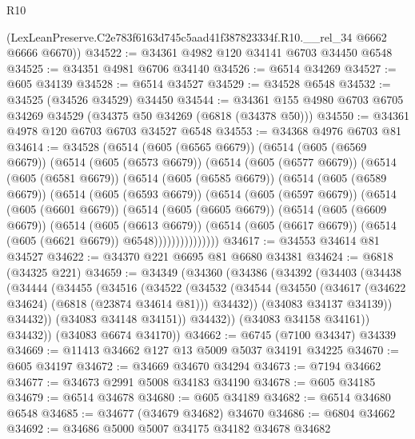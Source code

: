 \begin{lexlean}{R10}
\begin{coremodule}
      (LexLeanPreserve.C2e783f6163d745c5aad41f387823334f.R10.__rel_34 @6662 @6666 @6670))
@34522 := @34361 @4982 @120 @34141 @6703 @34450 @6548
@34525 := @34351 @4981 @6706 @34140
@34526 := @6514 @34269
@34527 := @605 @34139
@34528 := @6514 @34527
@34529 := @34528 @6548
@34532 := @34525 (@34526 @34529) @34450
@34544 := @34361 @155 @4980 @6703 @6705 @34269 @34529 (@34375 @50 @34269 (@6818 (@34378 @50)))
@34550 := @34361 @4978 @120 @6703 @6703 @34527 @6548
@34553 := @34368 @4976 @6703 @81
@34614 := @34528
    (@6514
      (@605 (@6565 @6679))
      (@6514
        (@605 (@6569 @6679))
        (@6514
          (@605 (@6573 @6679))
          (@6514
            (@605 (@6577 @6679))
            (@6514
              (@605 (@6581 @6679))
              (@6514
                (@605 (@6585 @6679))
                (@6514
                  (@605 (@6589 @6679))
                  (@6514
                    (@605 (@6593 @6679))
                    (@6514
                      (@605 (@6597 @6679))
                      (@6514
                        (@605 (@6601 @6679))
                        (@6514
                          (@605 (@6605 @6679))
                          (@6514
                            (@605 (@6609 @6679))
                            (@6514
                              (@605 (@6613 @6679))
                              (@6514
                                (@605 (@6617 @6679))
                                (@6514 (@605 (@6621 @6679)) @6548)))))))))))))))
@34617 := @34553 @34614 @81 @34527
@34622 := @34370 @221 @6695 @81 @6680 @34381
@34624 := @6818 (@34325 @221)
@34659 := @34349
    (@34360
      (@34386
        (@34392
          (@34403
            (@34438
              (@34444
                (@34455
                  (@34516
                    (@34522
                      (@34532
                        (@34544
                          (@34550 (@34617 (@34622 @34624) (@6818 (@23874 @34614 @81))) @34432))
                        (@34083 @34137 @34139))
                      @34432))
                  (@34083 @34148 @34151))
                @34432))
            (@34083 @34158 @34161))
          @34432))
      (@34083 @6674 @34170))
@34662 := @6745 (@7100 @34347) @34339
@34669 := @11413 @34662 @127 @13 @5009 @5037 @34191 @34225
@34670 := @605 @34197
@34672 := @34669 @34670 @34294
@34673 := @7194 @34662
@34677 := @34673 @2991 @5008 @34183 @34190
@34678 := @605 @34185
@34679 := @6514 @34678
@34680 := @605 @34189
@34682 := @6514 @34680 @6548
@34685 := @34677 (@34679 @34682) @34670
@34686 := @6804 @34662
@34692 := @34686 @5000 @5007 @34175 @34182 @34678 @34682

\end{coremodule}
\end{lexlean}
